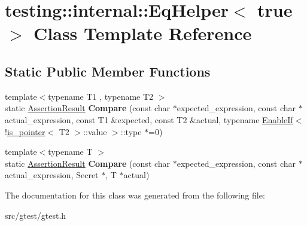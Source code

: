 \hypertarget{classtesting_1_1internal_1_1_eq_helper_3_01true_01_4}{}\section{testing\+:\+:internal\+:\+:Eq\+Helper$<$ true $>$ Class Template Reference}
\label{classtesting_1_1internal_1_1_eq_helper_3_01true_01_4}
\subsection*{Static Public Member Functions}
\begin{DoxyCompactItemize}
\item 
\mbox{\label{classtesting_1_1internal_1_1_eq_helper_3_01true_01_4_a70d6d7e3cb1df06ad6114f25e843fd6d}} 
{\footnotesize template$<$typename T1 , typename T2 $>$ }\\static \mbox{\hyperlink{classtesting_1_1_assertion_result}{Assertion\+Result}} {\bfseries Compare} (const char $\ast$expected\+\_\+expression, const char $\ast$actual\+\_\+expression, const T1 \&expected, const T2 \&actual, typename \mbox{\hyperlink{structtesting_1_1internal_1_1_enable_if}{Enable\+If}}$<$!\mbox{\hyperlink{structtesting_1_1internal_1_1is__pointer}{is\+\_\+pointer}}$<$ T2 $>$\+::value $>$\+::type $\ast$=0)
\item 
\mbox{\label{classtesting_1_1internal_1_1_eq_helper_3_01true_01_4_ab38e840297adb48f18767a1a99187fb3}} 
{\footnotesize template$<$typename T $>$ }\\static \mbox{\hyperlink{classtesting_1_1_assertion_result}{Assertion\+Result}} {\bfseries Compare} (const char $\ast$expected\+\_\+expression, const char $\ast$actual\+\_\+expression, Secret $\ast$, T $\ast$actual)
\end{DoxyCompactItemize}


The documentation for this class was generated from the following file\+:\begin{DoxyCompactItemize}
\item 
src/gtest/gtest.\+h\end{DoxyCompactItemize}
